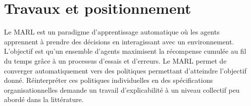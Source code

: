 \documentclass[demonstration]{jfsma}
\newcommand{\probP}{\text{I\kern-0.15em P}}
\newcommand{\jp}[1]{\textbf{\color{red} JPJ: #1}}
\begin{document}







\section{Travaux et positionnement}

Le MARL est un paradigme d'apprentissage automatique où les agents apprennent à prendre des décisions en interagissant avec un environnement. L’objectif est qu'un ensemble d'agents maximisent la récompense cumulée au fil du temps grâce à un processus d’essais et d’erreurs.
Le MARL permet de converger automatiquement vers des politiques permettant d'atteindre l'objectif donné. Réinterpréter ces politiques individuelles en des spécifications organisationnelles demande un travail d'explicabilité à un niveau collectif peu abordé dans la littérature.
\end{document}
